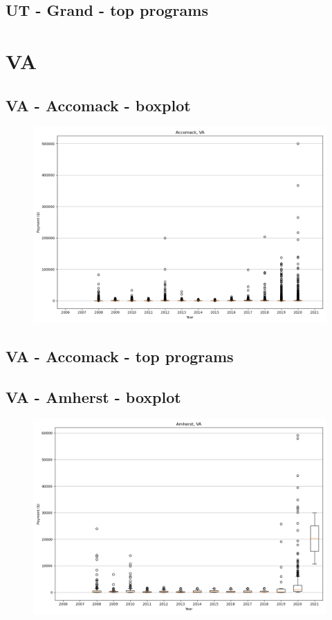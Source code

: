 \subsection*{UT - Grand - top programs}

\newpage
\section*{VA}
\subsection*{VA - Accomack - boxplot}
\begin{figure}[h]
\centering
\includegraphics[width=7in]{../output/boxplots/counties/Accomack-VA_boxplot.png}
\end{figure}


\subsection*{VA - Accomack - top programs}

\newpage
\subsection*{VA - Amherst - boxplot}
\begin{figure}[h]
\centering
\includegraphics[width=7in]{../output/boxplots/counties/Amherst-VA_boxplot.png}
\end{figure}


